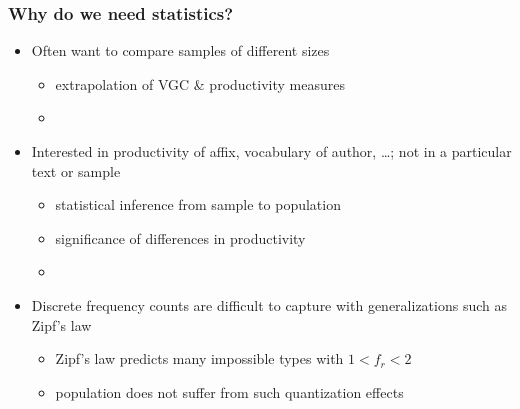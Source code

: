 \documentclass[t]{beamer} %
\begin{document}
\begin{frame}
  \frametitle{Why do we need statistics?}

  \begin{itemize}
  \item Often want to compare samples of different sizes
    \begin{itemize}
    \item[\hand] extrapolation of VGC \& productivity measures
    \item[]
    \end{itemize}
  \item<2-> Interested in productivity of affix, vocabulary of author, \ldots; not in a particular text or sample\\
    \begin{itemize}
    \item[\hand] statistical inference from sample to population
    \item[\hand] significance of differences in productivity
    \item[]
    \end{itemize}
  \item<3-> Discrete frequency counts are difficult to capture with generalizations such as Zipf's law
    \begin{itemize}
    \item[\hand] Zipf's law predicts many impossible types with $1 < f_r < 2$
    \item[\hand] population does not suffer from such quantization effects
    \end{itemize}
  \end{itemize}
\end{frame}
\end{document}
